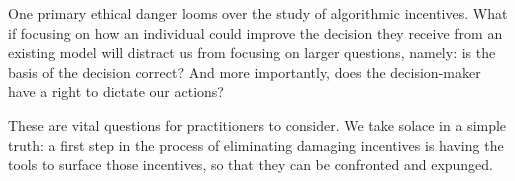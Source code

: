 
One primary ethical danger looms over the study of algorithmic incentives. What if focusing on how an individual could improve the decision they receive from an existing model will distract us from focusing on larger questions, namely: is the basis of the decision correct? And more importantly, does the decision-maker have a right to dictate our actions?

These are vital questions for practitioners to consider. We take solace in a simple truth:
a first step in the process of eliminating damaging incentives is having the tools to surface those incentives, so that they can be confronted and expunged.
